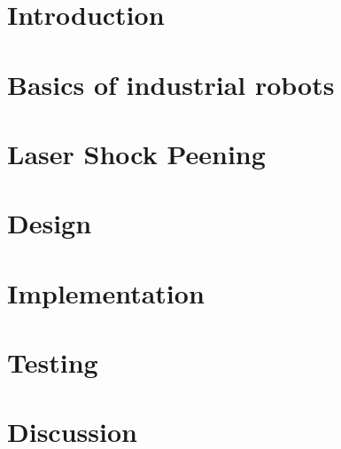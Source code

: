 \documentclass[a4paper,twoside,12pt]{book}
\renewcommand{\chaptermark}[1]{\markboth{#1}{#1}}
\begin{document}
\chapter*{Introduction} %

\pagestyle{fancy}
\renewcommand{\chaptermark}[1]{\markboth{#1}{#1}}
\fancyhead[R]{\chaptername\ \thechapter\ --\ \leftmark}
\fancyhead[L]{}




\chapter{Basics of industrial robots}



\chapter{Laser Shock Peening}

    

\chapter{Design}

    

\chapter{Implementation}

    

\chapter{Testing}

    

\chapter{Discussion}

    
    
\end{document}
